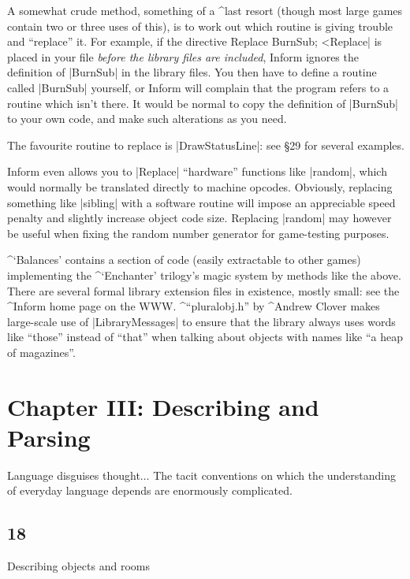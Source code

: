 {{A somewhat crude method, something of a ^{last resort} (though most large
games contain two or three uses of this), is to work out which routine is
giving trouble and ``replace'' it.  For example, if the directive
\beginstt
Replace BurnSub;
\endtt^^|Replace|
is placed in your file {\it before the library files are included},
Inform ignores the definition of |BurnSub| in the library files.
You then have to define a routine called |BurnSub| yourself, or Inform
will complain that the program refers to a routine which isn't there.
It would be normal to copy the definition of |BurnSub| to your own code,
and make such alterations as you need.

The favourite routine to replace is |DrawStatusLine|: see \S 29 for
several examples.

\ddanger
Inform even allows you to |Replace| ``hardware'' functions like |random|,
which would normally be translated directly to machine opcodes.  Obviously,
replacing something like |sibling| with a software routine will impose an
appreciable speed penalty and slightly increase object code size.  Replacing
|random| may however be useful when fixing the random number generator for
game-testing purposes.

\tenpoint

^{`Balances'} contains a section of code (easily extractable to
other games) implementing the ^{`Enchanter' trilogy}'s magic
system by methods like the above.
\nextref
There are several formal library extension files in existence,
mostly small: see the ^{Inform home page} on the WWW.
\nextref ^{``pluralobj.h''}
by ^{Andrew Clover} makes large-scale use of |LibraryMessages|
to ensure that the library always uses words like ``those''
instead of ``that'' when talking about objects with names like
``a heap of magazines''.

\chapter{Chapter III: Describing and Parsing}

\vskip 0.5in
\quote
Language disguises thought$\ldots$ The tacit conventions on which
the understanding of everyday language depends are enormously
complicated.

\section{18}{Describing objects and rooms}

}}

